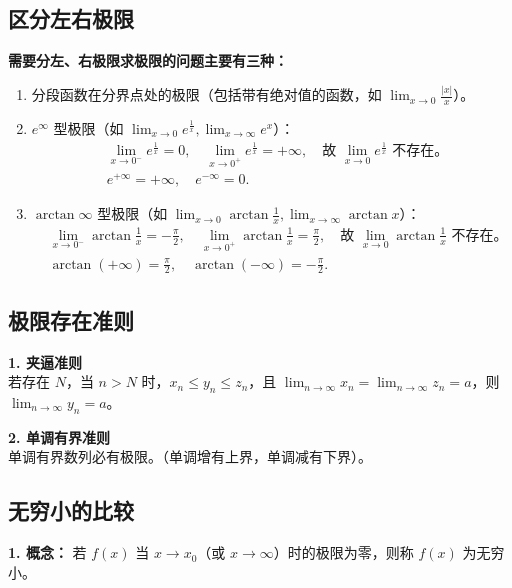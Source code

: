 \documentclass[a4paper,12pt]{ctexart}
\newenvironment{purplebox}
  {\begin{tcolorbox}[colback=white, colframe=boxpurple, boxrule=1pt, sharp corners, title=\textbf{定义/定理/核心公式}]}
  {\end{tcolorbox}}
\newcommand{\zh}[1]{\par\smallskip\noindent\textbf{#1}\par\smallskip}
\begin{document}
\subsection{区分左右极限}
\zh{需要分左、右极限求极限的问题主要有三种：}
\begin{enumerate}
    \item 分段函数在分界点处的极限（包括带有绝对值的函数，如 $\lim_{x \to 0} \frac{|x|}{x}$）。
    \item $e^\infty$ 型极限（如 $\lim_{x \to 0} e^{\frac{1}{x}}, \lim_{x \to \infty} e^x$）：
    \begin{align*}
        &\lim_{x \to 0^-} e^{\frac{1}{x}} = 0, \quad \lim_{x \to 0^+} e^{\frac{1}{x}} = +\infty, \quad \text{故 } \lim_{x \to 0} e^{\frac{1}{x}} \text{ 不存在。} \\
        &e^{+\infty} = +\infty, \quad e^{-\infty} = 0.
    \end{align*}
    \item $\arctan \infty$ 型极限（如 $\lim_{x \to 0} \arctan \frac{1}{x}, \lim_{x \to \infty} \arctan x$）：
    \begin{align*}
        &\lim_{x \to 0^-} \arctan \frac{1}{x} = -\frac{\pi}{2}, \quad \lim_{x \to 0^+} \arctan \frac{1}{x} = \frac{\pi}{2}, \quad \text{故 } \lim_{x \to 0} \arctan \frac{1}{x} \text{ 不存在。} \\
        &\arctan(+\infty) = \frac{\pi}{2}, \quad \arctan(-\infty) = -\frac{\pi}{2}.
    \end{align*}
\end{enumerate}

\subsection{极限存在准则}
\begin{purplebox}
    \textbf{1. 夹逼准则} \\
    若存在 $N$，当 $n > N$ 时，$x_n \leqslant y_n \leqslant z_n$，且 $\lim_{n \to \infty} x_n = \lim_{n \to \infty} z_n = a$，则 $\lim_{n \to \infty} y_n = a$。

    \textbf{2. 单调有界准则} \\
    单调有界数列必有极限。（单调增有上界，单调减有下界）。
\end{purplebox}

\subsection{无穷小的比较}
\textbf{1. 概念：} 若 $f(x)$ 当 $x \to x_0$（或 $x \to \infty$）时的极限为零，则称 $f(x)$ 为无穷小。
\end{document}
